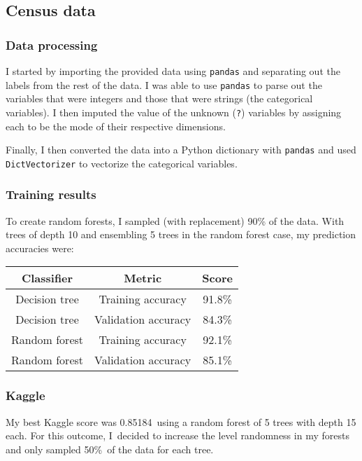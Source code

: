 \documentclass{report}
\begin{document}
\subsection*{Census data} 

\subsubsection*{Data processing}

I started by importing the provided data using \texttt{pandas} and separating out the labels from the rest of the data. I was able to use \texttt{pandas}  to parse out the variables that were integers and those that were strings (the categorical variables). I then imputed the value of the unknown (\texttt{?}) variables by assigning each to be the mode of their respective dimensions. \newline


Finally, I then converted the data into a Python dictionary with \texttt{pandas} and used \texttt{DictVectorizer} to vectorize the categorical variables.

\subsubsection*{Training results}

To create random forests, I sampled (with replacement) 90\% of the data. With trees of depth 10 and ensembling 5 trees in the random forest case, my prediction accuracies were:

\begin{center}
\begin{tabular} {|c | c | c |}
\hline
\textbf{Classifier} & \textbf{Metric} & \textbf{Score} \\
\hline
Decision tree & Training accuracy & 91.8\% \\
\hline
Decision tree & Validation accuracy & 84.3\% \\
\hline
Random forest & Training accuracy & 92.1\% \\
\hline
Random forest & Validation accuracy & 85.1\% \\
\hline
\end{tabular}
\end{center}

\subsubsection{Kaggle}

My best Kaggle score was 0.85184\ using a random forest of 5 trees with depth 15 each. For this outcome, I\ decided to increase the level randomness in my forests and only sampled 50\%\ of the data for each tree.
\end{document}
